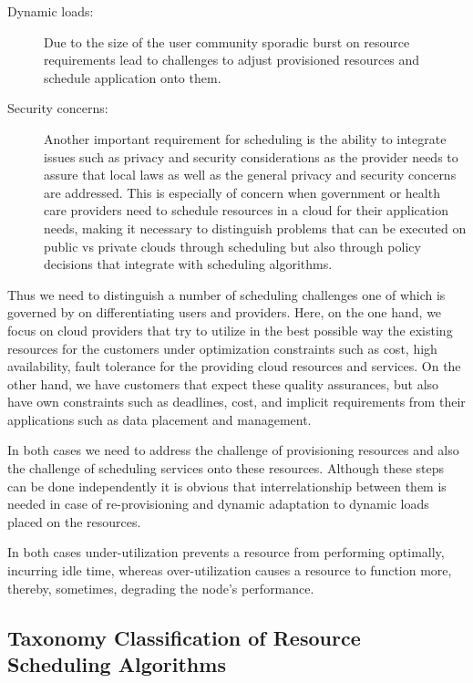 \documentclass[final,5p,times,twocolumn]{elsarticle}
\begin{document}
\begin{description}
\item[Dynamic loads:] Due to the size of the user community sporadic
  burst on resource requirements lead to challenges to adjust
  provisioned resources and schedule application onto them.

\item[Security concerns:] Another important requirement for scheduling
  is the ability to integrate issues such as privacy and security
  considerations as the provider needs to assure that local laws as
  well as the general privacy and security concerns are addressed.
  This is especially of concern when government or health care
  providers need to schedule resources in a cloud for their
  application needs, making it necessary to distinguish problems that
  can be executed on public vs private clouds through scheduling but
  also through policy decisions that integrate with scheduling
  algorithms.
  
\end{description}

Thus we need to distinguish a number of scheduling challenges one of
which is governed by on differentiating users and providers. Here, on
the one hand, we focus on cloud providers that try to utilize in the
best possible way the existing resources for the customers under
optimization constraints such as cost, high availability, fault
tolerance for the providing cloud resources and services. On the other
hand, we have customers that expect these quality assurances, but also
have own constraints such as deadlines, cost, and implicit
requirements from their applications such as data placement and
management.

In both cases we need to address the challenge of provisioning
resources and also the challenge of scheduling services onto these
resources. Although these steps can be done independently it is
obvious that interrelationship between them is needed in case of
re-provisioning and dynamic adaptation to dynamic loads placed on the
resources.

In both cases under-utilization prevents a resource from performing
optimally, incurring idle time, whereas over-utilization causes a
resource to function more, thereby, sometimes, degrading the node's
performance.





\subsection{Taxonomy Classification of Resource Scheduling Algorithms}\label{S:algo}
\end{document}
